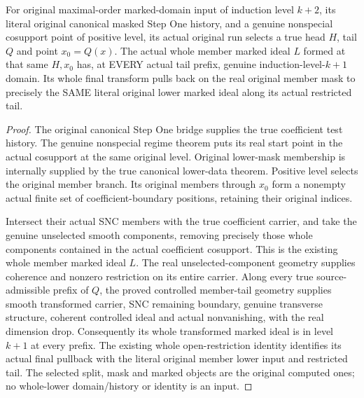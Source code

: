 \begin{lemma}
\label{hir:original-whole-member-computed-history-producer}
\leanok
{}
For original maximal-order marked-domain input of induction level $k+2$,
its literal original canonical masked Step One history, and a genuine
nonspecial cosupport point of positive level, its actual original run
selects a true head $H$, tail $Q$ and point $x_0=Q(x)$. The actual whole
member marked ideal $L$ formed at that same $H,x_0$ has, at EVERY actual
tail prefix, genuine induction-level-$k+1$ domain. Its whole final transform
pulls back on the real original member mask to precisely the SAME literal
original lower marked ideal along its actual restricted tail.
\end{lemma}
\begin{proof}
The original canonical Step One bridge supplies the true coefficient test
history. The genuine nonspecial regime theorem puts its real start point
in the actual cosupport at the same original level. Original lower-mask
membership is internally supplied by the true canonical lower-data theorem.
Positive level selects the original member branch. Its original members
through $x_0$ form a nonempty actual finite set of coefficient-boundary
positions, retaining their original indices.

Intersect their actual SNC members with the true coefficient carrier,
and take the genuine unselected smooth components, removing precisely
those whole components contained in the actual coefficient cosupport.
This is the existing whole member marked ideal $L$. The real
unselected-component geometry supplies coherence and nonzero restriction
on its entire carrier. Along every true source-admissible prefix of $Q$,
the proved controlled member-tail geometry supplies smooth transformed
carrier, SNC remaining boundary, genuine transverse structure, coherent
controlled ideal and actual nonvanishing, with the real dimension drop.
Consequently its whole transformed marked ideal is in level $k+1$ at
every prefix. The existing whole open-restriction identity identifies its
actual final pullback with the literal original member lower input and
restricted tail. The selected split, mask and marked objects are the
original computed ones; no whole-lower domain/history or identity is an input.
\end{proof}

